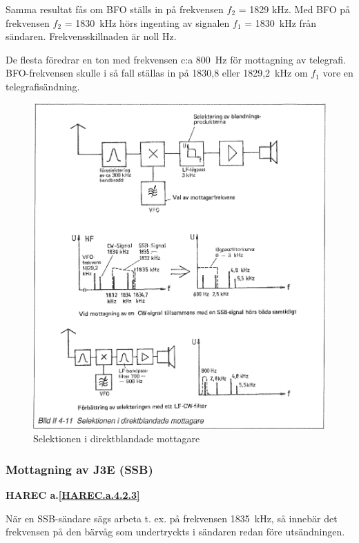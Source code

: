 Samma resultat fås om BFO ställs in på frekvensen \(f_2\) = 1829
kHz. Med BFO på frekvensen \(f_2\) = 1830~kHz hörs ingenting av
signalen \(f_1\) = 1830~kHz från sändaren.  Frekvensskillnaden är noll
Hz.

De flesta föredrar en ton med frekvensen c:a 800~Hz för mottagning av
telegrafi. BFO-frekvensen skulle i så fall ställas in på 1830,8 eller
1829,2~kHz om \(f_1\) vore en telegrafisändning.

\begin{figure}
  \includegraphics[width=\textwidth]{images/bild_2_4-11}
  \caption{Selektionen i direktblandade mottagare}
  \label{fig:bildII4-11}
\end{figure}

\subsubsection{Mottagning av J3E (SSB)}
\textbf{HAREC a.\ref{HAREC.a.4.2.3}\label{myHAREC.a.4.2.3}}

När en SSB-sändare sägs arbeta t. ex. på frekvensen 1835~kHz, så
innebär det frekvensen på den bärvåg som undertryckts i sändaren redan
före utsändningen.

